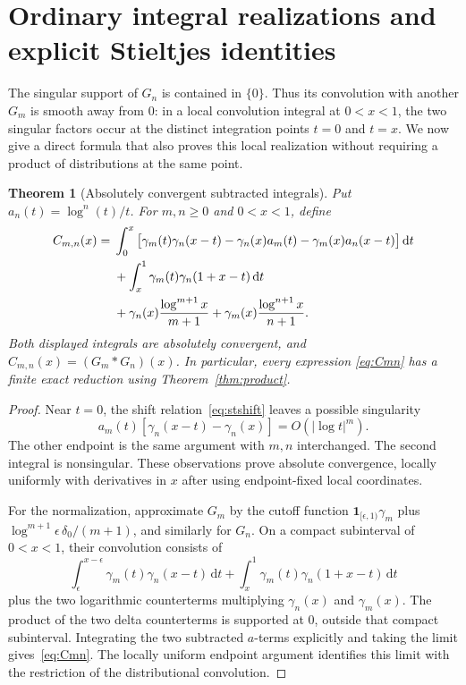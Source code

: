 \documentclass[11pt]{article}
\numberwithin{equation}{section}
\newtheorem{theorem}{Theorem}[section]
\theoremstyle{definition}
\theoremstyle{remark}
\newcommand{\dd}{\,\mathrm d}
\begin{document}
\section{Ordinary integral realizations and explicit Stieltjes identities}
\label{sec:integrals}
The singular support of $G_n$ is contained in $\{0\}$. Thus its
convolution with another $G_m$ is smooth away from $0$: in a local
convolution integral at $0<x<1$, the two singular factors occur at the
distinct integration points $t=0$ and $t=x$. We now give a direct formula
that also proves this local realization without requiring a product of
distributions at the same point.

\begin{theorem}[Absolutely convergent subtracted integrals]\label{thm:integral}
Put $a_n(t)=\log^n(t)/t$. For $m,n\ge0$ and $0<x<1$, define
\begin{align}
 C_{m,n}(x)={}&\int_0^x\big[\gamma_m(t)\gamma_n(x-t)
          -\gamma_n(x)a_m(t)-\gamma_m(x)a_n(x-t)\big]\dd t
          \label{eq:Cmn}\\
 &+\int_x^1\gamma_m(t)\gamma_n(1+x-t)\dd t\notag\\
 &+\gamma_n(x)\frac{\log^{m+1}x}{m+1}
  +\gamma_m(x)\frac{\log^{n+1}x}{n+1}.\notag
\end{align}
Both displayed integrals are absolutely convergent, and
$C_{m,n}(x)=(G_m*G_n)(x)$. In particular, every expression
\eqref{eq:Cmn} has a finite exact reduction using Theorem~\ref{thm:product}.
\end{theorem}
\begin{proof}
Near $t=0$, the shift relation~\eqref{eq:stshift} leaves a possible
singularity
\[
 a_m(t)[\gamma_n(x-t)-\gamma_n(x)]=O(|\log t|^m).
\]
The other endpoint is the same argument with $m,n$ interchanged. The
second integral is nonsingular. These observations prove absolute
convergence, locally uniformly with derivatives in $x$ after using
endpoint-fixed local coordinates.

For the normalization, approximate $G_m$ by the cutoff function
$\mathbf1_{[\epsilon,1)}\gamma_m$ plus
$\log^{m+1}\epsilon\,\delta_0/(m+1)$, and similarly for $G_n$. On a
compact subinterval of $0<x<1$, their convolution consists of
\[
 \int_\epsilon^{x-\epsilon}\gamma_m(t)\gamma_n(x-t)\dd t
 +\int_x^1\gamma_m(t)\gamma_n(1+x-t)\dd t
\]
plus the two logarithmic counterterms multiplying $\gamma_n(x)$ and
$\gamma_m(x)$. The product of the two delta counterterms is supported
at $0$, outside that compact subinterval. Integrating the two subtracted
$a$-terms explicitly and taking the limit gives~\eqref{eq:Cmn}.
The locally uniform endpoint argument identifies this limit with the
restriction of the distributional convolution.
\end{proof}
\end{document}
